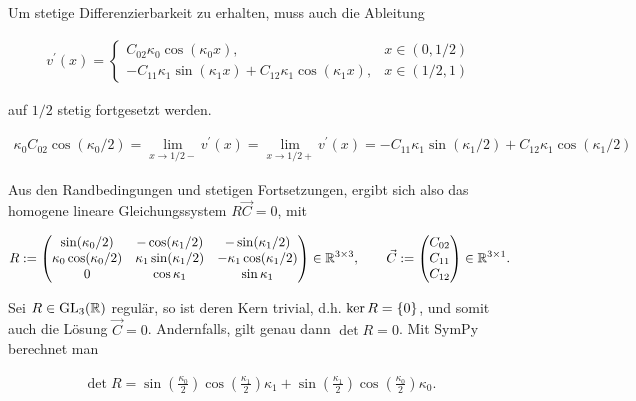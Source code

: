 Um stetige Differenzierbarkeit zu erhalten, muss auch die Ableitung

\begin{align*}
  v^\prime(x) =
  \begin{cases}
    C_{02} \kappa_0 \cos(\kappa_0 x),
    & x \in (0, 1/2) \\
    - C_{11} \kappa_1 \sin(\kappa_1 x) + C_{12} \kappa_1 \cos(\kappa_1 x),
    & x \in (1/2, 1)
  \end{cases}
\end{align*}

auf $1/2$ stetig fortgesetzt werden.

\begin{align*}
  \kappa_0 C_{02} \cos(\kappa_0/2)
  = \lim_{x \to 1/2-} v^\prime(x)
  = \lim_{x \to 1/2+} v^\prime(x)
  = - C_{11} \kappa_1 \sin(\kappa_1/2) + C_{12} \kappa_1 \cos(\kappa_1/2)
\end{align*}

Aus den Randbedingungen und stetigen Fortsetzungen, ergibt sich also das homogene lineare Gleichungssystem $R \vec C = 0$, mit

\begin{align*}
  R :=
  \begin{pmatrix}
    \sin(\kappa_0/2)          & -\cos(\kappa_1/2)         & -\sin(\kappa_1/2) \\
    \kappa_0 \cos(\kappa_0/2) & \kappa_1 \sin(\kappa_1/2) & - \kappa_1 \cos(\kappa_1/2) \\
    0                         & \cos{\kappa_1}            & \sin{\kappa_1}
  \end{pmatrix}
  \in \R^{3 \times 3}, \qquad
  \vec C :=
  \begin{pmatrix}
    C_{02} \\
    C_{11} \\
    C_{12}
  \end{pmatrix}
  \in \R^{3 \times 1}.
\end{align*}

Sei $R \in \GL[3]{\R}$ regulär, so ist deren Kern trivial, d.h. $\ker{R} = \Bbraces{0}$, und somit auch die Lösung $\vec C = 0$. Andernfalls, gilt genau dann $\det{R} = 0$. Mit SymPy berechnet man

\begin{align*}
  \det{R} =
  \sin{\left(\frac{{\kappa}_{0}}{2} \right)} \cos{\left(\frac{{\kappa}_{1}}{2} \right)} {\kappa}_{1} + \sin{\left(\frac{{\kappa}_{1}}{2} \right)} \cos{\left(\frac{{\kappa}_{0}}{2} \right)} {\kappa}_{0}.
\end{align*}

